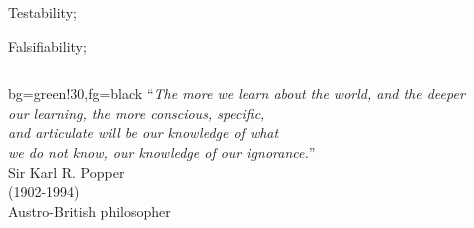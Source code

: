 \documentclass[t]{beamer}
\begin{document}
\begin{ftst}
\bitems Testability;
	\item Falsifiability;
\eitem
\vone
\begin{columns}[T]
	\begin{colorblock}{}{bg=green!30,fg=black}
	``\textit{The more we learn about the world, and the deeper\\
	our learning, the more conscious, specific,\\
	and articulate will be our knowledge of what\\
	we do not know, our knowledge of our ignorance.}''\\
	\flushright\vspace{-1em}\small Sir Karl R. Popper\\
	\flushright\vspace{-1em}\small (1902-1994)\\
	\flushright\vspace{-1em}\small Austro-British philosopher
	\end{colorblock}
\end{columns}
\end{ftst}
\end{document}
